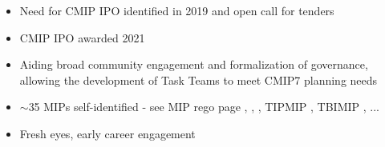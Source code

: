 \documentclass[gmd, preprint]{copernicus}
\def\cred#1{{\color{red}#1}}
\begin{document}
\cred{
\begin{itemize}
	\item Need for CMIP IPO identified in 2019 and open call for tenders
	\item CMIP IPO awarded 2021
	\item Aiding broad community engagement and formalization of governance, allowing the development of Task Teams to meet CMIP7 planning needs
	\item $\sim$35 MIPs self-identified - see MIP rego page \citep[LESFMIP;][]{smith_attribution_2022}, \citep[RAMIP;][]{wilcox_regional_2023}, \citep[CERESMIP;][]{schmidt_ceresmip_2023}, TIPMIP \citep[][]{winkelmann_tipping_2023}, TBIMIP \citep[][]{richter_tropical_2024}, ...
    \item Fresh eyes, early career engagement
\end{itemize}
}








\appendix
\end{document}
